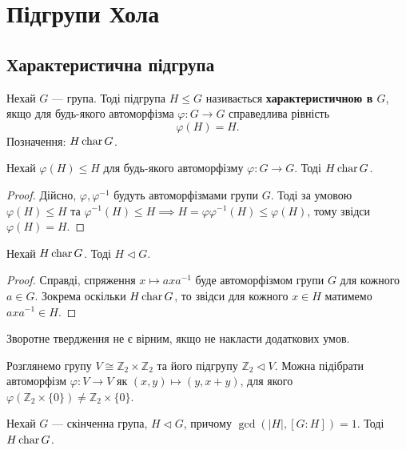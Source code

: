 \documentclass{math_library}
\begin{document}
\section{Підгрупи Хола}
\subsection{Характеристична підгрупа}
\begin{definition}
Нехай $G$ --- група. Тоді підгрупа $H \leq G$ називається \textbf{характеристичною в $G$}, якщо для будь-якого автоморфізма $\varphi \colon G \to G$ справедлива рівність
\[
\varphi(H) = H.
\]
Позначення: $H \operatorname{char} G$.
\end{definition}

\begin{proposition}
Нехай $\varphi(H) \leq H$ для будь-якого автоморфізму $\varphi \colon G \to G$. Тоді $H \operatorname{char} G$.
\end{proposition}

\begin{proof}
Дійсно, $\varphi,\varphi^{-1}$ будуть автоморфізмами групи $G$. Тоді за умовою $\varphi(H) \leq H$ та $\varphi^{-1}(H) \leq H \implies H = \varphi \varphi^{-1}(H) \leq \varphi(H)$, тому звідси $\varphi(H) = H$.
\end{proof}

\begin{proposition}
Нехай $H \operatorname{char} G$. Тоді $H \triangleleft G$.
\end{proposition}

\begin{proof}
Справді, спряження $x \mapsto axa^{-1}$ буде автоморфізмом групи $G$ для кожного $a \in G$. Зокрема оскільки $H \operatorname{char} G$, то звідси для кожного $x \in H$ матимемо $axa^{-1} \in H$.
\end{proof}

\begin{remark}
Зворотне твердження не є вірним, якщо не накласти додаткових умов.
\end{remark}

\begin{example}
Розглянемо групу $V \cong \mathbb{Z}_2 \times \mathbb{Z}_2$ та його підгрупу $\mathbb{Z}_2 \triangleleft V$. Можна підібрати автоморфізм $\varphi \colon V \to V$ як $(x,y) \mapsto (y, x+y)$, для якого $\varphi(\mathbb{Z}_2 \times \{0\}) \neq \mathbb{Z}_2 \times \{0\}$.
\end{example}

\begin{proposition}
\label{hall_normal_subgroup_is_characteristic}
Нехай $G$ --- скінченна група, $H \triangleleft G$, причому $\gcd(|H|, [G:H]) = 1$. Тоді $H \operatorname{char} G$.
\end{proposition}
\end{document}
